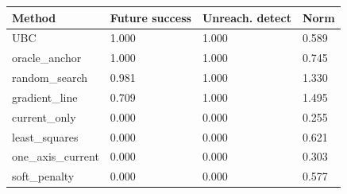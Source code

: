 \begin{tabular}{llll}
\toprule
Method & Future success & Unreach. detect & Norm \\
\midrule
UBC & 1.000 & 1.000 & 0.589 \\
oracle\_anchor & 1.000 & 1.000 & 0.745 \\
random\_search & 0.981 & 1.000 & 1.330 \\
gradient\_line & 0.709 & 1.000 & 1.495 \\
current\_only & 0.000 & 0.000 & 0.255 \\
least\_squares & 0.000 & 0.000 & 0.621 \\
one\_axis\_current & 0.000 & 0.000 & 0.303 \\
soft\_penalty & 0.000 & 0.000 & 0.577 \\
\bottomrule
\end{tabular}
